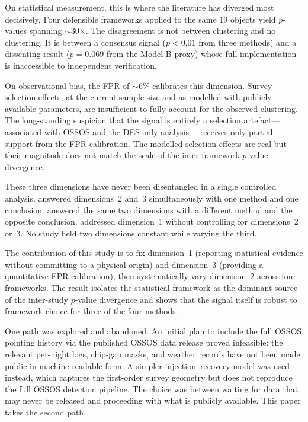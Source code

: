 \documentclass{aa}
\begin{document}
On statistical measurement, this is where the literature has diverged most decisively. Four defensible frameworks applied to the same 19 objects yield $p$-values spanning $\sim$30$\times$. The disagreement is not between clustering and no clustering. It is between a consensus signal ($p<0.01$ from three methods) and a dissenting result ($p=0.069$ from the Model B proxy) whose full implementation is inaccessible to independent verification.

On observational bias, the FPR of $\sim6\%$ calibrates this dimension. Survey selection effects, at the current sample size and as modelled with publicly available parameters, are insufficient to fully account for the observed clustering. The long-standing suspicion that the signal is entirely a selection artefact---associated with OSSOS \citep{shankman2017} and the DES-only analysis \citep{bernardinelli2020}---receives only partial support from the FPR calibration. The modelled selection effects are real but their magnitude does not match the scale of the inter-framework $p$-value divergence.

These three dimensions have never been disentangled in a single controlled analysis. \citet{batygin2016,brown2019} answered dimensions~2 and~3 simultaneously with one method and one conclusion. \citet{shankman2017} answered the same two dimensions with a different method and the opposite conclusion. \citet{madigan2018} addressed dimension~1 without controlling for dimensions~2 or~3. No study held two dimensions constant while varying the third.

The contribution of this study is to fix dimension~1 (reporting statistical evidence without committing to a physical origin) and dimension~3 (providing a quantitative FPR calibration), then systematically vary dimension~2 across four frameworks. The result isolates the statistical framework as the dominant source of the inter-study $p$-value divergence and shows that the signal itself is robust to framework choice for three of the four methods.

One path was explored and abandoned. An initial plan to include the full OSSOS pointing history via the published OSSOS data release proved infeasible: the relevant per-night logs, chip-gap masks, and weather records have not been made public in machine-readable form. A simpler injection--recovery model was used instead, which captures the first-order survey geometry but does not reproduce the full OSSOS detection pipeline. The choice was between waiting for data that may never be released and proceeding with what is publicly available. This paper takes the second path.
\end{document}
